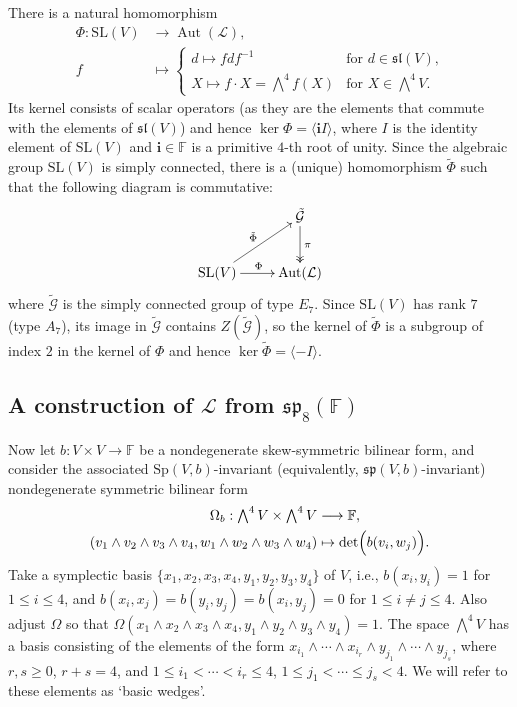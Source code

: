 \documentclass[a4paper,reqno]{amsart}
\theoremstyle{definition}
\numberwithin{theorem}{section}
\numberwithin{equation}{section}
\begin{document}
There is a natural homomorphism 
\[
\begin{split}
\Phi:{\mathrm{SL}}(V)&\longrightarrow \operatorname{\mathrm{Aut}}({\mathcal{L}}),\\
   f&\mapsto \begin{cases} d\mapsto fdf^{-1}&\text{for $d\in{{\mathfrak{sl}}}(V)$,}\\
                           X\mapsto f\cdot X=\textstyle{\bigwedge^4}f(X)&\text{for $X\in \bigwedge^4V$.}\end{cases}
\end{split}
\]
Its kernel consists of scalar operators (as they are the elements that commute with the elements of ${{\mathfrak{sl}}}(V)$) and hence $\ker\Phi=\langle {\mathbf{i}} I\rangle$, where $I$ is the identity element of ${\mathrm{SL}}(V)$ and ${\mathbf{i}}\in{\mathbb{F}}$ is a primitive $4$-th root of unity. Since the algebraic group ${\mathrm{SL}}(V)$ is simply connected, there is a (unique) homomorphism $\tilde\Phi$ such that the following diagram is commutative:
\begin{equation}\label{eq:SLV_E7sc}
\begin{aligned}
\xymatrix{
& \tilde{\mathcal{G}}\ar@{->>}[d]^{\pi}\\
{\mathrm{SL}}(V)\ar[r]^{\Phi} \ar[ur]^{\tilde\Phi} & \operatorname{\mathrm{Aut}}({\mathcal{L}})
}
\end{aligned}
\end{equation}
where $\tilde{\mathcal{G}}$ is the simply connected group of type $E_7$.
Since ${\mathrm{SL}}(V)$ has rank $7$ (type $A_7$), its image in $\tilde{\mathcal{G}}$ contains $Z(\tilde{\mathcal{G}})$, so the kernel of $\tilde\Phi$ is a subgroup of index $2$ in the kernel of $\Phi$ and hence $\ker\tilde\Phi=\langle -I\rangle$.

\subsection{A construction of ${\mathcal{L}}$ from ${{\mathfrak{sp}}}_8({\mathbb{F}})$}\label{ss:E7C4}

Now let $b:V\times V\rightarrow {\mathbb{F}}$ be a nondegenerate skew-symmetric bilinear form, and consider the associated ${\mathrm{Sp}}(V,b)$-invariant (equivalently, ${{\mathfrak{sp}}}(V,b)$-invariant) nondegenerate symmetric bilinear form
\[
\begin{split}
\Omega_b:{\textstyle \bigwedge^4V}\times {\textstyle \bigwedge^4V}&\longrightarrow {\mathbb{F}},\\
(v_1\wedge v_2\wedge v_3\wedge v_4,w_1\wedge w_2\wedge w_3\wedge w_4)&\mapsto 
\det\Bigl(b(v_i,w_j)\Bigr).
\end{split}
\]
Take a symplectic basis $\{x_1,x_2,x_3,x_4,y_1,y_2,y_3,y_4\}$ of $V$, i.e., $b(x_i,y_i)=1$ for $1\leq i\leq 4$, and $b(x_i,x_j)=b(y_i,y_j)=b(x_i,y_j)=0$ for $1\leq i\ne j\leq 4$. Also adjust $\Omega$ so that $\Omega(x_1\wedge x_2\wedge x_3\wedge x_4,y_1\wedge y_2\wedge y_3\wedge y_4)=1$. The space $\bigwedge^4 V$ has a basis consisting of the elements of the form $x_{i_1}\wedge \cdots\wedge x_{i_r}\wedge y_{j_1}\wedge\cdots\wedge y_{j_s}$, where $r,s\geq 0$, $r+s=4$, and $1\leq i_1< \cdots< i_r\leq 4$, $1\leq j_1< \cdots\leq j_s< 4$. We will refer to these elements as `basic wedges'.
\end{document}
